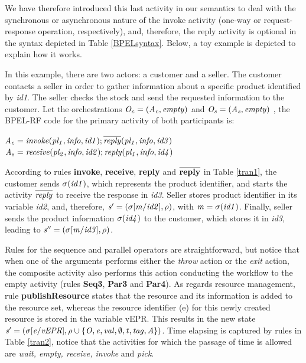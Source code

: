 We have therefore introduced this last activity
in our semantics to deal with the synchronous or asynchronous nature of
the invoke activity (one-way or request-response operation, respectively), and, therefore, the
reply activity is optional in the syntax depicted in Table \ref{BPELsyntax}. Below, a toy example 
is depicted to explain how it works.
\begin{example}\label{ex1} 
In this example, there are two actors: a customer and a
seller. The customer contacts a seller in order to gather information about a specific product identified by \emph{id1}. The seller checks the stock and send the requested information to the customer. Let the orchestrations ${\it O_{c}= (A_{c},empty)}$ and ${\it O_{s}= (A_{s},empty)}$ , the BPEL-RF code for the primary activity of both participants is:
\vspace{0.3cm}
\begin{flushleft}
\hspace{1cm}${\it A_{c}= invoke(pl_1,info,id1);\overline{reply}(pl_1,info,id3)}$\\
\hspace{1cm}${\it A_{s}= receive(pl_2,info,id2);reply(pl_1,info,id4)}$
\end{flushleft}
\end{example}

According to rules {\bf invoke}, {\bf receive}, {\bf reply} and {\bf $\overline{{\bf reply}}$} in Table \ref{tran1},  the customer sends ${\it \sigma(id1)}$, which represents the product identifier, and starts the activity ${\it \overline{reply}}$ to receive the response in {\it id3}. Seller stores product identifier in its variable {\it id2}, and, therefore, ${\it s'=(\sigma[m/id2],\rho)}$, with ${\it m=\sigma(id1)}$. Finally, seller sends the product information ${\it \sigma(id4)}$ to the customer, which stores it in {\it id3}, leading to ${\it s''=(\sigma[m/id3],\rho)}$.

Rules for the sequence and parallel operators are straightforward, but notice that when one of the
arguments performs either the \emph{throw} action or the \emph{exit} action, the composite
activity also performs this action conducting the workflow to the empty activity (rules {\bf Seq3}, {\bf Par3} and {\bf Par4}). As regards resource management, rule {\bf publishResource} states that the resource and its information is added to the resource set, whereas the resource identifier (e) for this newly created resource is stored in the variable vEPR. This results in the new state $\it{s'=(\sigma[e/vEPR], \rho \cup \{O,e,val,\emptyset,t,tag,A\})}$. Time elapsing is captured by rules in Table \ref{tran2}, notice that the activities for which the passage of time is allowed are {\em wait, empty, receive, invoke} and {\em pick}.

